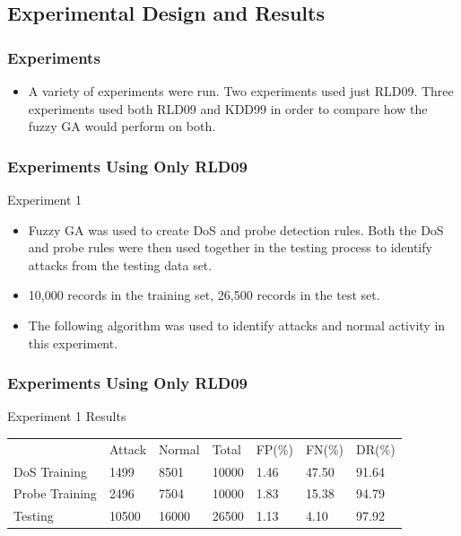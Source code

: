 \documentclass{beamer}
\newcommand{\linespace}{\vskip 0.25cm}
\begin{document}
\subsection{Experimental Design and Results}

\begin{frame}
	\frametitle{Experiments}
	\begin{itemize}
		\item A variety of experiments were run. Two experiments used just RLD09. Three experiments used both RLD09 and KDD99 in order to compare how the fuzzy GA would perform on both.
	\end{itemize}
\end{frame}


\begin{frame}
	\frametitle{Experiments Using Only RLD09}
	Experiment 1
	\begin{itemize}
		\item Fuzzy GA was used to create DoS and probe detection rules. Both the DoS and probe rules were then used together in the testing process to identify attacks from the testing data set.
		\item 10,000 records in the training set, 26,500 records in the test set.
	\end{itemize}

\linespace
\begin{itemize}
	\item The following algorithm was used to identify attacks and normal activity in this experiment.
\end{itemize}

\begin{algorithmic}
\ELSE {}
\ENDIF
\end{algorithmic}
\end{frame}


\begin{frame}
	\frametitle{Experiments Using Only RLD09}
	Experiment 1 Results
\begin{table}
\begin{small}
\begin{tabular}{lllllll}
 & Attack & Normal & Total & FP(\%) & FN(\%) & DR(\%)\\
DoS Training & 1499 & 8501 & 10000 & 1.46 & 47.50 & 91.64\\
Probe Training & 2496 & 7504 & 10000 & 1.83 & 15.38 & 94.79\\
Testing & 10500 & 16000 & 26500 & 1.13 & 4.10 & 97.92\\
\end{tabular}
\end{small}
\end{table}
\end{frame}
\end{document}
